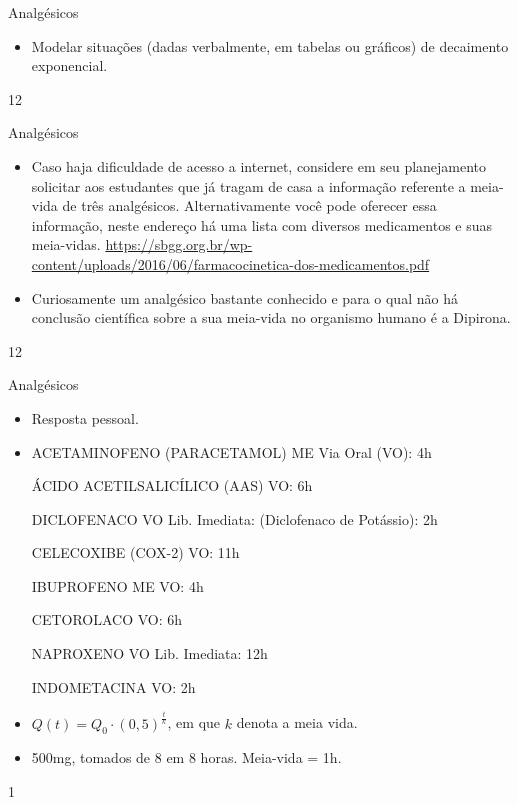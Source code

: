 
\begin{objectives}{Analgésicos}
{
\begin{itemize}
\item Modelar situações (dadas verbalmente, em tabelas ou gráficos) de decaimento exponencial.

\end{itemize}
}{1}{2}
\end{objectives}
\begin{sugestions}{Analgésicos}
{
\begin{itemize}
\item Caso haja dificuldade de acesso a internet, considere em seu planejamento solicitar aos estudantes que já tragam de casa a informação referente a meia-vida de três analgésicos. Alternativamente você pode oferecer essa informação, neste endereço há uma lista com diversos medicamentos e suas meia-vidas.  
\url{https://sbgg.org.br/wp-content/uploads/2016/06/farmacocinetica-dos-medicamentos.pdf}

\item Curiosamente um analgésico bastante conhecido e para o qual não há conclusão científica sobre a sua meia-vida no organismo humano é a Dipirona.

\end{itemize}
}{1}{2}
\end{sugestions}
\begin{answer}{Analgésicos}
{
\begin{itemize}

\item Resposta pessoal.

\item ACETAMINOFENO (PARACETAMOL) ME Via Oral (VO): 4h

ÁCIDO ACETILSALICÍLICO (AAS) VO: 6h 

DICLOFENACO VO Lib. Imediata: (Diclofenaco de Potássio): 2h

CELECOXIBE (COX-2) VO: 11h 

IBUPROFENO ME VO: 4h

CETOROLACO VO: 6h 

NAPROXENO VO Lib. Imediata: 12h 

INDOMETACINA VO: 2h

\item $Q(t)=Q_0\cdot (0{,}5)^{\frac tk}$, em que $k$ denota a meia vida.

\item 5$00$mg, tomados de 8 em 8 horas. Meia-vida = 1h.

\end{itemize}
}{1}
\end{answer}
